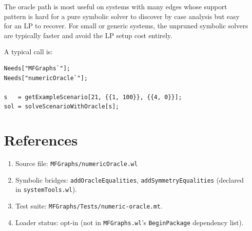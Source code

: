 \documentclass[11pt]{article}
\begin{document}
The oracle path is most useful on systems with many edges whose support pattern is hard for a pure symbolic solver to discover by case analysis but easy for an LP to recover. For small or generic systems, the unpruned symbolic solvers are typically faster and avoid the LP setup cost entirely.

A typical call is:

\begin{verbatim}
Needs["MFGraphs`"];
Needs["numericOracle`"];

s   = getExampleScenario[21, {{1, 100}}, {{4, 0}}];
sol = solveScenarioWithOracle[s];
\end{verbatim}

\section*{References}

\begin{enumerate}
\item Source file: \texttt{MFGraphs/numericOracle.wl}
\item Symbolic bridges: \texttt{addOracleEqualities}, \texttt{addSymmetryEqualities} (declared in \texttt{systemTools.wl}).
\item Test suite: \texttt{MFGraphs/Tests/numeric-oracle.mt}.
\item Loader status: opt-in (not in \texttt{MFGraphs.wl}'s \texttt{BeginPackage} dependency list).
\end{enumerate}
\end{document}
